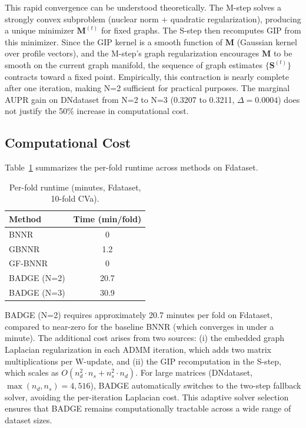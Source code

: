 \documentclass{oup-authoring-template}
\begin{document}
This rapid convergence can be understood theoretically. The M-step solves a strongly convex subproblem (nuclear norm + quadratic regularization), producing a unique minimizer $\mathbf{M}^{(t)}$ for fixed graphs. The S-step then recomputes GIP from this minimizer. Since the GIP kernel is a smooth function of $\mathbf{M}$ (Gaussian kernel over profile vectors), and the M-step's graph regularization encourages $\mathbf{M}$ to be smooth on the current graph manifold, the sequence of graph estimates $\{\mathbf{S}^{(t)}\}$ contracts toward a fixed point. Empirically, this contraction is nearly complete after one iteration, making N=2 sufficient for practical purposes. The marginal AUPR gain on DNdataset from N=2 to N=3 (0.3207 to 0.3211, $\Delta = 0.0004$) does not justify the 50\% increase in computational cost.

\subsection{Computational Cost}

Table~\ref{tab:cost} summarizes the per-fold runtime across methods on Fdataset.

\begin{table}[htbp]
\centering
\caption{Per-fold runtime (minutes, Fdataset, 10-fold CVa).}
\label{tab:cost}
\begin{tabular}{lc}
\toprule
Method & Time (min/fold) \\
\midrule
BNNR & 0 \\
GBNNR & 1.2 \\
GF-BNNR & 0 \\
BADGE (N=2) & 20.7 \\
BADGE (N=3) & 30.9 \\
\bottomrule
\end{tabular}
\end{table}

BADGE (N=2) requires approximately 20.7 minutes per fold on Fdataset, compared to near-zero for the baseline BNNR (which converges in under a minute). The additional cost arises from two sources: (i) the embedded graph Laplacian regularization in each ADMM iteration, which adds two matrix multiplications per W-update, and (ii) the GIP recomputation in the S-step, which scales as $O(n_d^2 \cdot n_s + n_s^2 \cdot n_d)$. For large matrices (DNdataset, $\max(n_d, n_s) = 4,516$), BADGE automatically switches to the two-step fallback solver, avoiding the per-iteration Laplacian cost. This adaptive solver selection ensures that BADGE remains computationally tractable across a wide range of dataset sizes.
\end{document}
